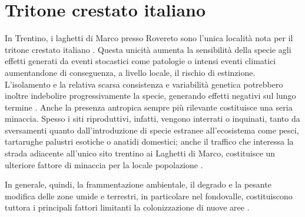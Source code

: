 \documentclass[10pt,twoside,openany,x11names,svgnames,italian,a5paper,dvipsnames,table]{memoir}
\begin{document}
\section{Tritone crestato italiano}
In Trentino, i laghetti di Marco presso Rovereto sono l’unica località nota per il tritone crestato italiano \cite{Caldonazzi02}. Questa unicità aumenta la sensibilità della specie agli effetti generati da eventi stocastici come patologie o intensi eventi climatici aumentandone di conseguenza, a livello locale, il rischio di estinzione. L'isolamento e la relativa scarsa consistenza e variabilità genetica potrebbero inoltre indebolire progressivamente la specie, generando effetti negativi sul lungo termine \cite{Biasioli11} \cite{Scoccianti01}. Anche la presenza antropica sempre più rilevante costituisce una seria minaccia. Spesso i siti riproduttivi, infatti, vengono interrati o inquinati, tanto da sversamenti quanto dall’introduzione di specie estranee all’ecosistema come pesci, tartarughe palustri esotiche o anatidi domestici; anche il traffico che interessa la strada adiacente all’unico sito trentino ai Laghetti di Marco, costituisce un ulteriore fattore di minaccia per la locale popolazione \cite{AAVV04} \cite{AAVV11a}.

In generale, quindi, la frammentazione ambientale, il degrado e la pesante modifica delle zone umide e terrestri, in particolare nel fondovalle, costituiscono tuttora i principali fattori limitanti la colonizzazione di nuove aree \cite{AAVV04} \cite{Caldonazzi02}. 
\end{document}
